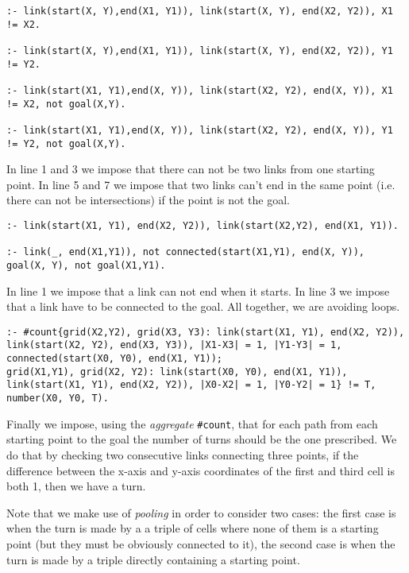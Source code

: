 \begin{verbatim}
:- link(start(X, Y),end(X1, Y1)), link(start(X, Y), end(X2, Y2)), X1 != X2. 

:- link(start(X, Y),end(X1, Y1)), link(start(X, Y), end(X2, Y2)), Y1 != Y2. 

:- link(start(X1, Y1),end(X, Y)), link(start(X2, Y2), end(X, Y)), X1 != X2, not goal(X,Y). 

:- link(start(X1, Y1),end(X, Y)), link(start(X2, Y2), end(X, Y)), Y1 != Y2, not goal(X,Y). 
\end{verbatim}

In line 1 and 3 we impose that there can not be two links from one starting point. In line 5 and 7 we impose that two links can't end in the same point (i.e. there can not be intersections) if the point is not the goal.
\begin{verbatim}
:- link(start(X1, Y1), end(X2, Y2)), link(start(X2,Y2), end(X1, Y1)).

:- link(_, end(X1,Y1)), not connected(start(X1,Y1), end(X, Y)), goal(X, Y), not goal(X1,Y1). 
\end{verbatim}

In line 1 we  impose that a link can not end when it starts. In line 3 we impose that a link have to be connected to the goal. All together, we are avoiding loops.

\begin{verbatim}
:- #count{grid(X2,Y2), grid(X3, Y3): link(start(X1, Y1), end(X2, Y2)), link(start(X2, Y2), end(X3, Y3)), |X1-X3| = 1, |Y1-Y3| = 1, connected(start(X0, Y0), end(X1, Y1));
grid(X1,Y1), grid(X2, Y2): link(start(X0, Y0), end(X1, Y1)), link(start(X1, Y1), end(X2, Y2)), |X0-X2| = 1, |Y0-Y2| = 1} != T, number(X0, Y0, T).
\end{verbatim}

Finally we impose, using the \emph{aggregate} \texttt{#count}, that for each path from each starting point to the goal the number of turns should be the one prescribed. We do that by checking two consecutive links connecting three points, if the difference between the x-axis and y-axis coordinates of the first and third cell is both 1, then we have a turn.

 Note that we make use of \emph{pooling} in order to consider two cases: the first case is when the turn is made by a a triple of cells where none of them is a starting point (but they must be obviously connected to it), the second case is when the turn is made by a triple directly containing a starting point.

